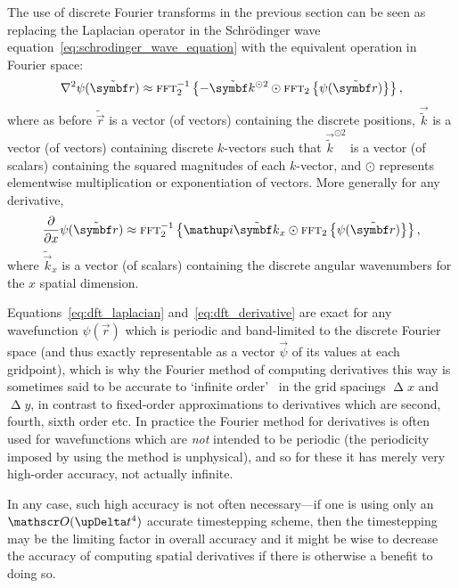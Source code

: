 The use of discrete Fourier transforms in the previous section can be seen as replacing the Laplacian operator in the Schr\"odinger wave equation~\eqref{eq:schrodinger_wave_equation} with the equivalent operation in Fourier space:
\begin{align}\label{eq:dft_laplacian}
\nabla^2\psi(\tilde{\vec r}) \approx \fft_2^{-1}\left\{-\tilde{\vec k}^{\odot 2} \odot \fft_2\left\{\psi(\tilde{\vec r})\right\}\right\},
\end{align}
where as before $\tilde{\vec r}$ is a vector (of vectors) containing the discrete positions, $\vec{\tilde k}$ is a vector (of vectors) containing discrete $k$-vectors such that $\vec{\tilde k}^{\odot 2}$ is a vector (of scalars) containing the squared magnitudes of each $k$-vector, and $\odot$ represents elementwise multiplication or exponentiation of vectors. More generally for any derivative,
\begin{align}\label{eq:dft_derivative}
\pdv{x}\psi(\tilde{\vec r}) \approx \fft_2^{-1}\left\{\ii\tilde{\vec k}_x \odot \fft_2\left\{\psi(\tilde{\vec r})\right\}\right\},
\end{align}
where $\tilde{\vec k}_x$ is a vector (of scalars) containing the discrete angular wavenumbers for the $x$ spatial dimension.

Equations~\eqref{eq:dft_laplacian} and~\eqref{eq:dft_derivative} are exact for any wavefunction $\psi(\vec r)$ which is periodic and band-limited to the discrete Fourier space (and thus exactly representable as a vector $\vec \psi$ of its values at each gridpoint), which is why the Fourier method of computing derivatives this way is sometimes said to be accurate to `infinite order'~\cite{fornberg_pseudospectral_1987} in the grid spacings $\upDelta x$ and $\upDelta y$, in contrast to fixed-order approximations to derivatives which are second, fourth, sixth order etc. In practice the Fourier method for derivatives is often used for wavefunctions which are \emph{not} intended to be periodic (the periodicity imposed by using the method is unphysical), and so for these it has merely very high-order accuracy, not actually infinite. 

In any case, such high accuracy is not often necessary---if one is using only an $\Ord{\upDelta t^4}$ accurate timestepping scheme, then the timestepping may be the limiting factor in overall accuracy and it might be wise to decrease the accuracy of computing spatial derivatives if there is otherwise a benefit to doing so.

